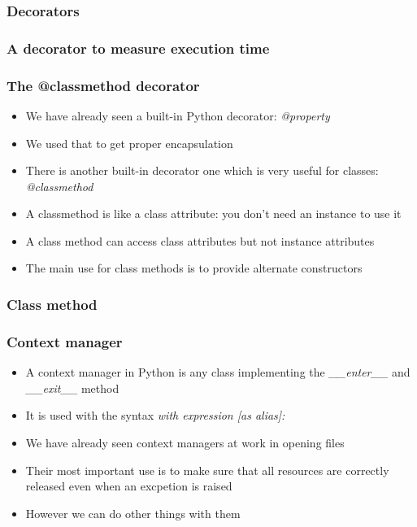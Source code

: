 \documentclass[9pt]{beamer}
\begin{document}
\begin{frame}
  \frametitle{Decorators}
  
\end{frame}


\begin{frame}
  \frametitle{A decorator to measure execution time}
  
\end{frame}


\begin{frame}
  \frametitle{The @classmethod decorator}
  \begin{itemize}
    \item We have already seen a built-in Python decorator: \emph{@property}
    \item We used that to get proper encapsulation
    \item There is another built-in decorator one which is very useful for classes: \alert{\emph{@classmethod}}
    \item A classmethod is like a class attribute: you don't need an instance to
          use it
    \item A class method can access class attributes but not instance attributes
    \item The main use for class methods is to provide \alert{alternate constructors}
  \end{itemize}
  
\end{frame}


\begin{frame}
  \frametitle{Class method}
  
\end{frame}


\begin{frame}
  \frametitle{Context manager}
  \begin{itemize}
    \item A \alert{context manager} in Python is any class implementing the \emph{\_\_enter\_\_} and
          \emph{\_\_exit\_\_} method
    \item It is used with the syntax \emph{with expression [as alias]:}
    \item We have already seen context managers at work in opening files
    \item Their most important use is to make sure that all resources are correctly released
          \alert{even when an excpetion is raised}
    \item However we can do other things with them
  \end{itemize}
  
\end{frame}
\end{document}
